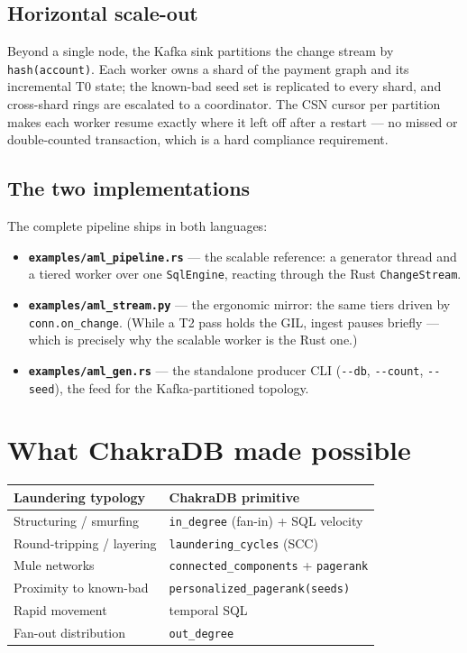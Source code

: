 \documentclass[
  11pt,
  openany]{book}
\providecommand{\tightlist}{%
  \setlength{\itemsep}{0pt}\setlength{\parskip}{0pt}}
\begin{document}
\subsection{Horizontal scale-out}\label{horizontal-scale-out}

Beyond a single node, the Kafka sink partitions the change stream by
\texttt{hash(account)}. Each worker owns a shard of the payment graph
and its incremental T0 state; the known-bad seed set is replicated to
every shard, and cross-shard rings are escalated to a coordinator. The
CSN cursor per partition makes each worker resume exactly where it left
off after a restart --- no missed or double-counted transaction, which
is a hard compliance requirement.

\subsection{The two implementations}\label{the-two-implementations}

The complete pipeline ships in both languages:

\begin{itemize}
\tightlist
\item
  \textbf{\texttt{examples/aml\_pipeline.rs}} --- the scalable
  reference: a generator thread and a tiered worker over one
  \texttt{SqlEngine}, reacting through the Rust \texttt{ChangeStream}.
\item
  \textbf{\texttt{examples/aml\_stream.py}} --- the ergonomic mirror:
  the same tiers driven by \texttt{conn.on\_change}. (While a T2 pass
  holds the GIL, ingest pauses briefly --- which is precisely why the
  scalable worker is the Rust one.)
\item
  \textbf{\texttt{examples/aml\_gen.rs}} --- the standalone producer CLI
  (\texttt{-\/-db}, \texttt{-\/-count}, \texttt{-\/-seed}), the feed for
  the Kafka-partitioned topology.
\end{itemize}

\section{What ChakraDB made possible}\label{what-chakradb-made-possible}

\begin{longtable}[]{@{}ll@{}}
\toprule\noalign{}
Laundering typology & ChakraDB primitive \\
\midrule\noalign{}
\endhead
\bottomrule\noalign{}
\endlastfoot
Structuring / smurfing & \texttt{in\_degree} (fan-in) + SQL velocity \\
Round-tripping / layering & \texttt{laundering\_cycles} (SCC) \\
Mule networks & \texttt{connected\_components} + \texttt{pagerank} \\
Proximity to known-bad & \texttt{personalized\_pagerank(seeds)} \\
Rapid movement & temporal SQL \\
Fan-out distribution & \texttt{out\_degree} \\
\end{longtable}
\end{document}
